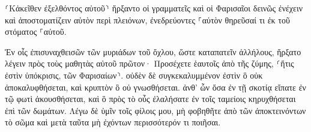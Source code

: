 \documentclass{openreader}
\begin{document}
⸂Κἀκεῖθεν ἐξελθόντος αὐτοῦ⸃ ἤρξαντο οἱ γραμματεῖς καὶ οἱ Φαρισαῖοι δεινῶς ἐνέχειν καὶ ἀποστοματίζειν αὐτὸν περὶ πλειόνων, 
ἐνεδρεύοντες ⸀αὐτὸν θηρεῦσαί τι ἐκ τοῦ στόματος ⸀αὐτοῦ. 

Ἐν οἷς ἐπισυναχθεισῶν τῶν μυριάδων τοῦ ὄχλου, ὥστε καταπατεῖν ἀλλήλους, ἤρξατο λέγειν πρὸς τοὺς μαθητὰς αὐτοῦ πρῶτον· Προσέχετε ἑαυτοῖς ἀπὸ τῆς ζύμης, ⸂ἥτις ἐστὶν ὑπόκρισις, τῶν Φαρισαίων⸃. 
οὐδὲν δὲ συγκεκαλυμμένον ἐστὶν ὃ οὐκ ἀποκαλυφθήσεται, καὶ κρυπτὸν ὃ οὐ γνωσθήσεται. 
ἀνθ’ ὧν ὅσα ἐν τῇ σκοτίᾳ εἴπατε ἐν τῷ φωτὶ ἀκουσθήσεται, καὶ ὃ πρὸς τὸ οὖς ἐλαλήσατε ἐν τοῖς ταμείοις κηρυχθήσεται ἐπὶ τῶν δωμάτων. 
Λέγω δὲ ὑμῖν τοῖς φίλοις μου, μὴ φοβηθῆτε ἀπὸ τῶν ἀποκτεινόντων τὸ σῶμα καὶ μετὰ ταῦτα μὴ ἐχόντων περισσότερόν τι ποιῆσαι. 
\end{document}
